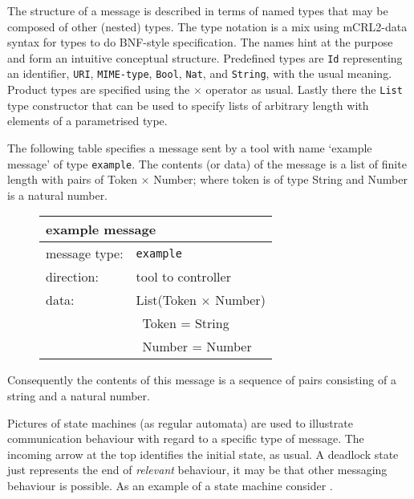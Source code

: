 \documentclass{article}
\newcommand{\msg}[1]{\texttt{#1}}
\begin{document}
   The structure of a message is described in terms of named types that may be
   composed of other (nested) types. The type notation is a mix using
   mCRL2-data syntax for types to do BNF-style specification.  The names hint
   at the purpose and form an intuitive conceptual structure.  Predefined types
   are \texttt{Id} representing an identifier, \texttt{URI},
   \texttt{MIME-type}, \texttt{Bool}, \texttt{Nat}, and \texttt{String}, with
   the usual meaning.  Product types are specified using the $\times$ operator
   as usual. Lastly there the \texttt{List} type constructor that can be used
   to specify lists of arbitrary length with elements of a parametrised type.
   
   The following table specifies a message sent by a tool with name `example
   message' of type \msg{example}.  The contents (or data) of the message is a
   list of finite length with pairs of Token $\times$ Number; where token is of
   type String and Number is a natural number.

   \begin{figure}[H]
    \begin{center}
     \begin{tabular}{|ll|}
      \hline
       \multicolumn{2}{|l|}{\textbf{example message}} \\
      \hline
       message type:    & \msg{example} \\
      \hline
       direction:       & tool to controller \\
       data:            & List(Token $\times$ Number) \\
                        & \ Token  = String \\
                        & \ Number = Number \\
      \hline
     \end{tabular}
     \vspace{-0.3cm}
    \end{center}
   \end{figure}
   \noindent Consequently the contents of this message is a sequence of pairs
   consisting of a string and a natural number.

   \noindent Pictures of state machines (as regular automata) are used to
   illustrate communication behaviour with regard to a specific type of
   message. The incoming arrow at the top identifies the initial state, as
   usual. A deadlock state just represents the end of \emph{relevant}
   behaviour, it may be that other messaging behaviour is possible. As an
   example of a state machine consider \label{fig::identification}.
\end{document}

